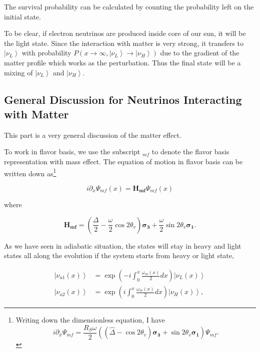 \documentclass{tufte-handout}
\newcommand{\ket}[1]{\left| #1\right\rangle}
\begin{document}
The survival probability can be calculated by counting the probability left on the initial state.

To be clear, if electron neutrinos are produced inside core of our sun, it will be the light state. Since the interaction with matter is very strong, it transfers to $\ket{\nu_L}$ with probability $P(x\to \infty, \ket{\nu_L}\to\ket{\nu_H}) $ due to the gradient of the matter profile which works as the perturbation. Thus the final state will be a mixing of $\ket{\nu_L}$ and $\ket{\nu_H}$.






\subsection{General Discussion for Neutrinos Interacting with Matter}


This part is a very general discussion of the matter effect.\cite{Parke1986}

To work in flavor basis, we use the subscript ${}_{mf}$ to denote the flavor basis representation with mass effect. The equation of motion in flavor basis can be written down as\footnote{Writing down the dimensionless equation, I have 
\begin{equation*}
i \partial_{\hat x} \Psi_{mf} = \frac{R_S \omega}{2} ( (\hat\Delta - \cos 2\theta_v ) \boldsymbol{\sigma_3} + \sin 2\theta_v \boldsymbol{\sigma_1} )  \Psi_{mf} .
\end{equation*}
}

\begin{equation*}
i\partial_x \Psi_{mf}(x) = \mathbf{H_{mf}} \Psi_{mf}(x)
\end{equation*}

where 

\begin{equation*}
\mathbf{H_{mf}} =  \left(  \frac{\Delta}{2} -  \frac{\omega}{2} \cos 2\theta_v  \right) \boldsymbol{\sigma_3} + \frac{\omega}{2} \sin 2\theta_v \boldsymbol{\sigma_1}.
\end{equation*}



As we have seen in adiabatic situation, the states will stay in heavy and light states all along the evolution if the system starts from heavy or light state,

\begin{align*}
\ket{\nu_{a1}(x)} &= \exp(-i \int_0^x \frac{\omega_m(x)}{2} dx )  \ket{\nu_L(x)} \\
\ket{\nu_{a2}(x)} &= \exp(i\int_0^x \frac{\omega_m(x)}{2} dx) \ket{\nu_H(x)},
\end{align*}
\end{document}
